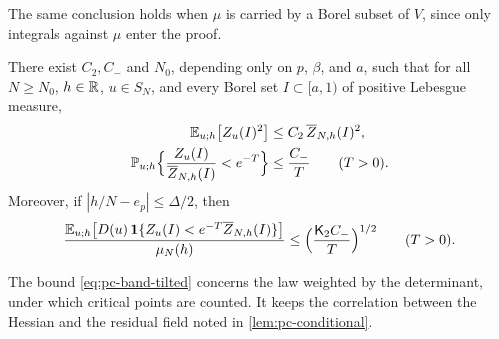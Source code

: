 The same conclusion holds when $\mu$ is carried by a Borel subset of $V$, since only integrals against $\mu$ enter the proof.

\begin{proposition}\label{prop:pc-bands}
There exist $C_2,C_-$ and $N_0$, depending only on $p$, $\beta$, and $a$, such that for all $N\ge N_0$, $h\in\mathbb R$, $u\in S_N$, and every Borel set $I\subset[a,1)$ of positive Lebesgue measure,
\begin{align}
\mathbb E_{u;h}\bigl[Z_u(I)^2\bigr]&\le C_2\,\overline Z_{N,h}(I)^2,\label{eq:pc-band-second}\\
\mathbb P_{u;h}\Bigl\{\frac{Z_u(I)}{\overline Z_{N,h}(I)}<e^{-T}\Bigr\}&\le\frac{C_-}T\qquad(T>0).\label{eq:pc-band-lower}
\end{align}
Moreover, if $|h/N-e_p|\le\Delta/2$, then
\begin{equation}\label{eq:pc-band-tilted}
\frac{\mathbb E_{u;h}\bigl[D(u)\,\mathbf 1\{Z_u(I)<e^{-T}\overline Z_{N,h}(I)\}\bigr]}{\mu_N(h)}\le\Bigl(\frac{\mathsf K_2C_-}T\Bigr)^{1/2}\qquad(T>0).
\end{equation}
\end{proposition}

The bound \eqref{eq:pc-band-tilted} concerns the law weighted by the determinant, under which critical points are counted. It keeps the correlation between the Hessian and the residual field noted in \cref{lem:pc-conditional}.

